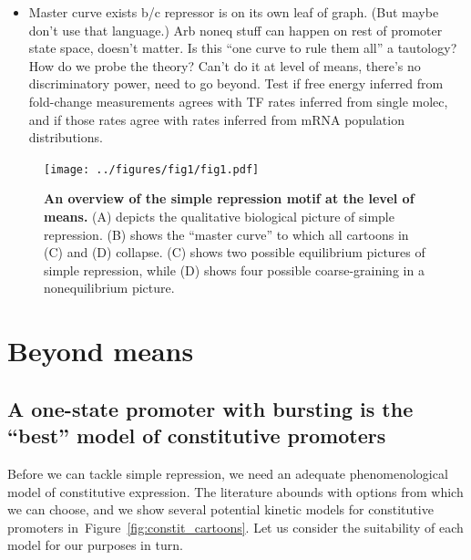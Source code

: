 \documentclass[12pt]{article}%
\newcommand{\fig}[1]{Figure~\ref{#1}}
\begin{document}
{\begin{itemize}
repressor params or expression levels precisely enough to detect
the expected tiny deviations from $\rho=1$. We can estimate: how
good would determination of $\Delta F_R$ in Fig~1B have to be to
get a given uncertainty in $\rho$? I think it's approx 1-to-1:
e.g., an uncertainty of 0.1 (kT) in $\Delta F_R$ converts to a
0.1 uncert in $\log\rho$, and since $\rho\approx 1$, that means
$\log(1+\Delta\rho)\approx\Delta\rho\approx 0.1$.
That's a really hard determination of $\Delta F_R$ for a very
coarse determination of $\rho$. Doubtful that inference of
kinetic rates would be any easier and probably a lot harder.Also,
in vitro RNAP data says $\rho\approx 1$ should be true, and even
if that's the wrong quantity to be talking about, Manuel's
inference of $k^+$ and $k^-$ suggests that still $\rho$ is close
to 1, and that inference is agnostic to the microscopics.
\item Master curve exists b/c repressor is on its own leaf of
graph. (But maybe don't use that language.) Arb noneq stuff can
happen on rest of promoter state space, doesn't matter. Is this
``one curve to rule them all'' a tautology? How do we probe the
theory? Can't do it at level of means, there's no discriminatory
power, need to go beyond. Test if free energy inferred from
fold-change measurements agrees with TF rates inferred from
single molec, and if those rates agree with rates inferred from
mRNA population distributions.
\end{itemize}
}
\begin{figure}%
\centering
\texttt{[image: ../figures/fig1/fig1.pdf]}
\caption{\textbf{
    An overview of the simple repression motif at the level of means.}
    (A) depicts the qualitative biological picture of simple repression.
    (B) shows the ``master curve'' to which all cartoons in (C) and (D) collapse.
    (C) shows two possible equilibrium pictures of simple repression, while
    (D) shows four possible coarse-graining in a nonequilibrium picture.
    }
\label{fig1:means_cartoons}
\end{figure}

\section{Beyond means}
\subsection{A one-state promoter with bursting is the ``best'' model of constitutive promoters}
Before we can tackle simple repression, we need an adequate
phenomenological model of constitutive expression.
The literature abounds with options from which we can choose,
and we show several potential kinetic models for constitutive promoters
in~\fig{fig:constit_cartoons}.
Let us consider the suitability of each model for our purposes in turn.
\end{document}
